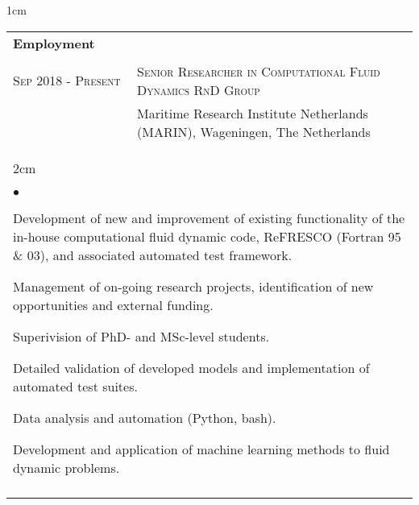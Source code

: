 \documentclass[a4paper,10pt]{article}
\newcommand{\squishlist}{
	\begin{list}{$\bullet$}
	{
		\setlength{\itemsep}{0pt}
		\setlength{\parsep}{0pt}
		\setlength{\topsep}{0pt}
		\setlength{\partopsep}{0pt}
		\setlength{\leftmargin}{2em}
		\setlength{\labelwidth}{1.5em}
		\setlength{\labelsep}{0.5em}
	}
}
\newcommand{\squishend}{\end{list}}
\begin{document}
\begin{minipage}{\textwidth}
\begin{adjustwidth}{}{1cm}

\begin{tabular}{p{3.5cm} p{12.9cm}}

\textbf{Employment} \\
\\

\textsc{Sep 2018 - Present} & \textsc{Senior Researcher in Computational Fluid Dynamics RnD Group} \\
							& Maritime Research Institute Netherlands (MARIN), Wageningen, The Netherlands \vspace{0.1cm} \\
%
\multicolumn{2}{l}{
\hspace{1cm}\begin{minipage}[t]{\textwidth}
\begin{adjustwidth}{}{2cm}
\squishlist
	\item Development of new and improvement of existing functionality of the in-house computational fluid dynamic code, ReFRESCO (Fortran 95 \& 03), and associated automated test framework.
	\item Management of on-going research projects, identification of new opportunities and external funding.
	\item Superivision of PhD- and MSc-level students.
	\item Detailed validation of developed models and implementation of automated test suites.
	\item Data analysis and automation (Python, bash).
	\item Development and application of machine learning methods to fluid dynamic problems.
\squishend
\end{adjustwidth}
\end{minipage}
} \\
\\


\end{tabular}
\end{adjustwidth}
\end{minipage}
\end{document}
